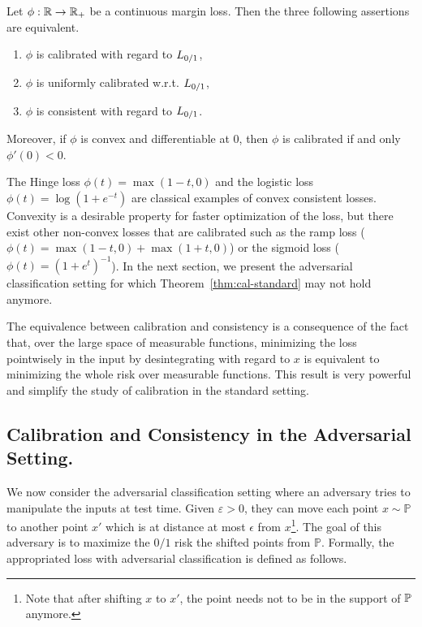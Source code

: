 \begin{thm}
\label{thm:cal-standard}
Let $\phi:\mathbb{R}\to\mathbb{R}_+$ be  a continuous margin loss. Then the three following assertions are equivalent.
    \begin{enumerate}
    \item $\phi$ is calibrated with regard to $L_{0/1}$,
    \item $\phi$ is uniformly calibrated w.r.t. $L_{0/1}$,
    \item $\phi$ is consistent with regard to $L_{0/1}$.
    \end{enumerate} 
Moreover, if $\phi$ is convex and differentiable at $0$, then $\phi$ is calibrated if and only $\phi'(0)<0$.
\end{thm}


The Hinge loss $\phi(t) = \max (1-t,0)$ and the logistic loss $\phi(t) = \log(1+e^{-t})$ are classical examples of convex consistent losses. Convexity is a desirable property for faster optimization of the loss, but there exist other non-convex losses that are calibrated such as the ramp loss ($\phi(t) = \max (1-t,0) + \max (1+t,0)$) or the sigmoid loss ($\phi(t) = (1+e^t)^{-1}$). In the next section, we present the adversarial classification setting for which Theorem~\ref{thm:cal-standard} may not hold anymore. 



\begin{rmq}
The equivalence between calibration and consistency is a consequence of the fact that, over the large space of measurable functions, minimizing the loss pointwisely in the input by desintegrating with regard to $x$ is equivalent to minimizing the whole risk over measurable functions. This result is very powerful and simplify the study of calibration in the standard setting. 
\end{rmq}



\subsection{Calibration and Consistency in the Adversarial Setting.}


We now consider the adversarial classification setting where an adversary tries to manipulate the inputs at test time. Given  $\varepsilon>0$, they can move each point $x \sim \mathbb{P}$ to another point $x'$ which is at distance at most $\epsilon$ from $x$\footnote{Note that after shifting $x$ to $x'$, the point needs not to be in the support of $\mathbb{P}$ anymore.}. The goal of this adversary is to maximize the $0/1$ risk the shifted points from $\mathbb{P}$. Formally, the  appropriated loss with adversarial classification is defined as follows.

